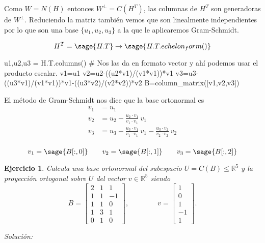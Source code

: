 \documentclass{amsart}
\newtheorem{ejer}{Ejercicio}
\def\r{\mathbb{R}}
\begin{document}

Como $W = N (H)$ entonces $W^\perp = C(H^T)$, las columnas de $H^T$ son generadoras de $W^\perp$. 
Reduciendo la matriz también vemos que son linealmente independientes por lo que son una base $\{u_1,u_2,u_3\}$
a la que le aplicaremos Gram-Schmidt. 

$$ H^T = \sage{H.T} \to \sage{H.T.echelon_form()} $$

\begin{sageblock}
u1,u2,u3 = H.T.columns() # Nos las da en formato vector y ahí podemos usar el producto escalar.
v1=u1
v2=u2-((u2*v1)/(v1*v1))*v1
v3=u3-((u3*v1)/(v1*v1))*v1-((u3*v2)/(v2*v2))*v2
B=column_matrix([v1,v2,v3])
\end{sageblock}

El método de Gram-Schmidt nos dice que la base ortonormal es 
\begin{align*}
v_1 &= u_1 \\
v_2 &= u_2-\frac{u_2\cdot v_1}{v_1\cdot v_1} \ v_1 \\
v_3 &= u_3-\frac{u_3\cdot v_1}{v_1\cdot v_1} \ v_1 - \frac{u_3\cdot v_2}{v_2\cdot v_2} \ v_2 \\
\end{align*}

$$ v_1=\sage{B[:,0]} \qquad v_2=\sage{B[:,1]} \qquad v_3=\sage{B[:,2]} $$


\vspace{0.5cm}
\begin{ejer} Calcula una base ortonormal del subespacio $U=C(B) \leq \r^5$ y la proyección ortogonal sobre $U$ del vector 
$v\in \r^5$ siendo
$$
    B=
    \left[
    \begin{array}{rrr}
    2 & 1 & 1 \\
    1 & 1 & -1 \\
    1 & 1 & 0 \\
    1 & 3 & 1 \\
    0 & 1 & 0
    \end{array}
    \right],
    \qquad\qquad
    v=
    \left[
    \begin{array}{r}
    1 \\
    0 \\
    1 \\
    -1 \\
    1
    \end{array}
    \right].
$$
\end{ejer}
{\it Solución:}

\end{document}
